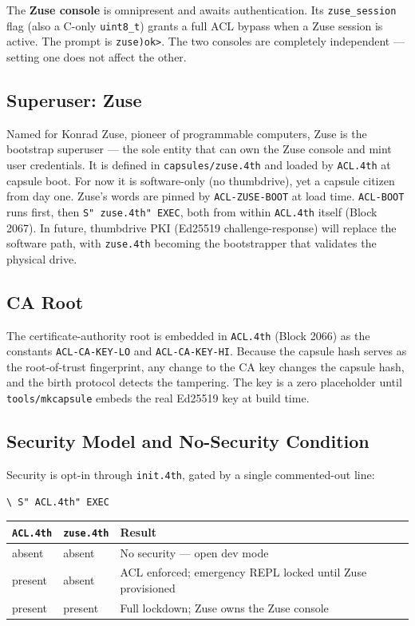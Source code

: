 The \textbf{Zuse console} is omnipresent and awaits authentication. Its
\texttt{zuse\_session} flag (also a C-only \texttt{uint8\_t}) grants a full ACL
bypass when a Zuse session is active. The prompt is \texttt{zuse)ok>}. The two
consoles are completely independent --- setting one does not affect the other.

\subsection{Superuser: Zuse}

Named for Konrad Zuse, pioneer of programmable computers, Zuse is the bootstrap
superuser --- the sole entity that can own the Zuse console and mint user
credentials. It is defined in \texttt{capsules/zuse.4th} and loaded by
\texttt{ACL.4th} at capsule boot. For now it is software-only (no thumbdrive),
yet a capsule citizen from day one. Zuse's words are pinned by
\texttt{ACL-ZUSE-BOOT} at load time. \texttt{ACL-BOOT} runs first, then
\texttt{S" zuse.4th" EXEC}, both from within \texttt{ACL.4th} itself (Block
2067). In future, thumbdrive PKI (Ed25519 challenge-response) will replace the
software path, with \texttt{zuse.4th} becoming the bootstrapper that validates
the physical drive.

\subsection{CA Root}

The certificate-authority root is embedded in \texttt{ACL.4th} (Block 2066) as
the constants \texttt{ACL-CA-KEY-LO} and \texttt{ACL-CA-KEY-HI}. Because the
capsule hash serves as the root-of-trust fingerprint, any change to the CA key
changes the capsule hash, and the birth protocol detects the tampering. The key
is a zero placeholder until \texttt{tools/mkcapsule} embeds the real Ed25519 key
at build time.

\subsection{Security Model and No-Security Condition}

Security is opt-in through \texttt{init.4th}, gated by a single commented-out
line:

\begin{lstlisting}[language=Forth]
\ S" ACL.4th" EXEC
\end{lstlisting}

\begin{tabular}{lll}
\toprule
\texttt{ACL.4th} & \texttt{zuse.4th} & Result \\
\midrule
absent & absent & No security --- open dev mode \\
present & absent & ACL enforced; emergency REPL locked until Zuse provisioned \\
present & present & Full lockdown; Zuse owns the Zuse console \\
\bottomrule
\end{tabular}

